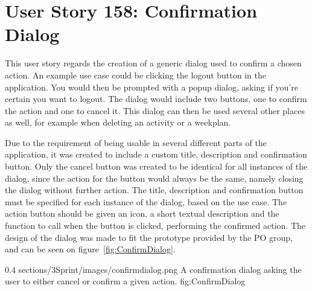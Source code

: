 \section{User Story 158: Confirmation Dialog}
This user story regards the creation of a generic dialog used to confirm a chosen action. An example use case could be clicking the logout button in the application. You would then be prompted with a popup dialog, asking if you're certain you want to logout. The dialog would include two buttons, one to confirm the action and one to cancel it. This dialog can then be used several other places as well, for example when deleting an activity or a weekplan. 

Due to the requirement of being usable in several different parts of the application, it was created to include a custom title, description and confirmation button. Only the cancel button was created to be identical for all instances of the dialog, since the action for the button would always be the same, namely closing the dialog without further action.
The title, description and confirmation button must be specified for each instance of the dialog, based on the use case. The action button should be given an icon, a short textual description and the function to call when the button is clicked, performing the confirmed action.
The design of the dialog was made to fit the prototype provided by the PO group, and can be seen on figure~\ref{fig:ConfirmDialog}.


        {0.4} %
        {sections/3Sprint/images/confirmdialog.png} %
        {A confirmation dialog asking the user to either cancel or confirm a given action.} %
        {fig:ConfirmDialog} %

